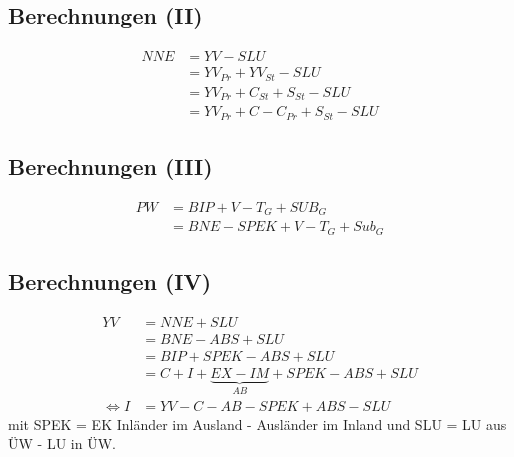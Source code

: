 \documentclass{scrartcl}
\begin{document}
\subsection{Berechnungen (II)}
\begin{align*}
  NNE &= YV - SLU \\&=YV_{Pr} + YV_{St} - SLU \\&= YV_{Pr}+ C_{St} + S_{St} - SLU \\&= YV_{Pr}+ C- C_{Pr} + S_{St} - SLU
\end{align*}

\subsection{Berechnungen (III)}
\begin{align*}
  PW &= BIP + V-T_G + SUB_G \\&= BNE-SPEK+V-T_G+Sub_G
\end{align*}

\subsection{Berechnungen (IV)}
\begin{align*}
  YV &= NNE+SLU \\&=BNE-ABS+SLU\\&=BIP+SPEK-ABS+SLU\\&=C+I+\underbrace{EX-IM}_{AB}+SPEK-ABS+SLU\\
  \Leftrightarrow I &= YV-C-AB-SPEK+ABS-SLU
\end{align*}
mit SPEK = EK Inl\"{a}nder im Ausland - Ausl\"{a}nder im Inland und SLU = LU aus \"{U}W - LU in \"{U}W.
\end{document}
